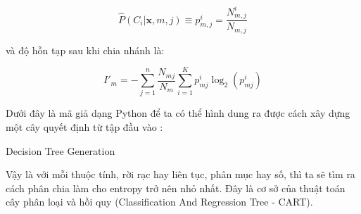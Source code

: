 \begin{equation} \hat{P}(C_i|\mathbf{x}, m, j) \equiv p^i_{m, j} = \frac{N^i_{m, j}}{N_{m, j}} \end{equation}

và độ hỗn tạp sau khi chia nhánh là:

\begin{equation} I'_m = -\sum^n_{j=1}\frac{N_{mj}}{N_m} \sum_{i = 1}^{K} {p^i_{mj} \log_2(p^i_{mj})} \end{equation}

Dưới đây là mã giả dạng Python để ta có thể hình dung ra được cách xây dựng một cây quyết định từ tập đầu vào \cite{alpaydin2010introml}:

\begin{algorithm}[H]
    \caption{Decision Tree Generation}
    
    
\end{algorithm}

Vậy là với mỗi thuộc tính, rời rạc hay liên tục, phân mục hay số, thì ta sẽ tìm ra cách phân chia làm cho entropy trở nên nhỏ nhất. Đây là cơ sở của thuật toán cây phân loại và hồi quy (Classification And Regression Tree - CART).


